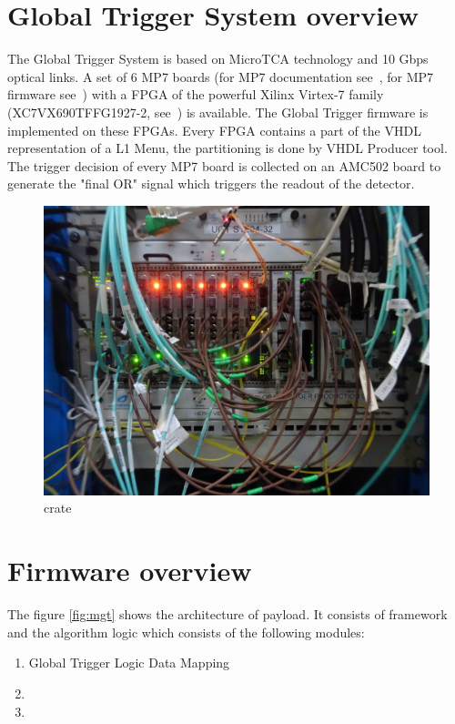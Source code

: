\section{Global Trigger System overview}\label{sec:fw:gt_system}

The Global Trigger System is based on MicroTCA technology and 10 Gbps optical links. A set of 6 MP7 boards (for MP7 documentation see~\cite{MP7}, for MP7 firmware see~\cite{MP7 firmware}) with a FPGA of the powerful Xilinx Virtex-7 family (XC7VX690TFFG1927-2, see~\cite{Virtex7}) is available. The Global Trigger firmware is implemented on these FPGAs. Every FPGA contains a part of the VHDL representation of a L1 Menu, the partitioning is done by VHDL Producer tool. The trigger decision of every MP7 board is collected on an AMC502 board to generate the "final OR" signal which triggers the readout of the detector.

\begin{figure}[h!]
   \centering
    \includegraphics[width=1.0\textwidth]{figures/prodcrate_DSC09437.jpeg}
    \caption{\ugt crate}\label{fig:fw:mgt_crate}
\end{figure}

\section{Firmware overview}\label{sec:fw:fw}
The figure \ref{fig:mgt} shows the architecture of \ugt payload. It consists of framework and the algorithm logic which consists of the following modules:
\begin{enumerate}
\item Global Trigger Logic Data Mapping
\item \ugtl
\item \ufdl
\end{enumerate}

